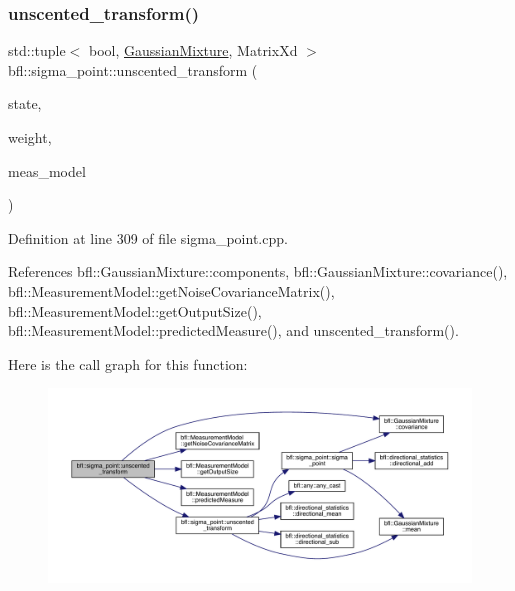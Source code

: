 \subsubsection{\texorpdfstring{unscented\+\_\+transform()}{unscented\_transform()}\hspace{0.1cm}{\footnotesize\ttfamily [8/8]}}
{\footnotesize\ttfamily std\+::tuple$<$ bool, \mbox{\hyperlink{classbfl_1_1GaussianMixture}{Gaussian\+Mixture}}, Matrix\+Xd $>$ bfl\+::sigma\+\_\+point\+::unscented\+\_\+transform (\begin{DoxyParamCaption}\item[{const \mbox{\hyperlink{classbfl_1_1GaussianMixture}{Gaussian\+Mixture}} \&}]{state,  }\item[{const \mbox{\hyperlink{structbfl_1_1sigma__point_1_1UTWeight}{U\+T\+Weight}} \&}]{weight,  }\item[{\mbox{\hyperlink{classbfl_1_1AdditiveMeasurementModel}{Additive\+Measurement\+Model}} \&}]{meas\+\_\+model }\end{DoxyParamCaption})}



Definition at line 309 of file sigma\+\_\+point.\+cpp.



References bfl\+::\+Gaussian\+Mixture\+::components, bfl\+::\+Gaussian\+Mixture\+::covariance(), bfl\+::\+Measurement\+Model\+::get\+Noise\+Covariance\+Matrix(), bfl\+::\+Measurement\+Model\+::get\+Output\+Size(), bfl\+::\+Measurement\+Model\+::predicted\+Measure(), and unscented\+\_\+transform().

Here is the call graph for this function\+:
\nopagebreak
\begin{figure}[H]
\begin{center}
\leavevmode
\includegraphics[width=350pt]{namespacebfl_1_1sigma__point_a27f6087b127407402338b68bf7853ae6_cgraph}
\end{center}
\end{figure}
\mbox{\label{namespacebfl_1_1sigma__point_a2cdca209c158edd6440c2f077b345799}} 
